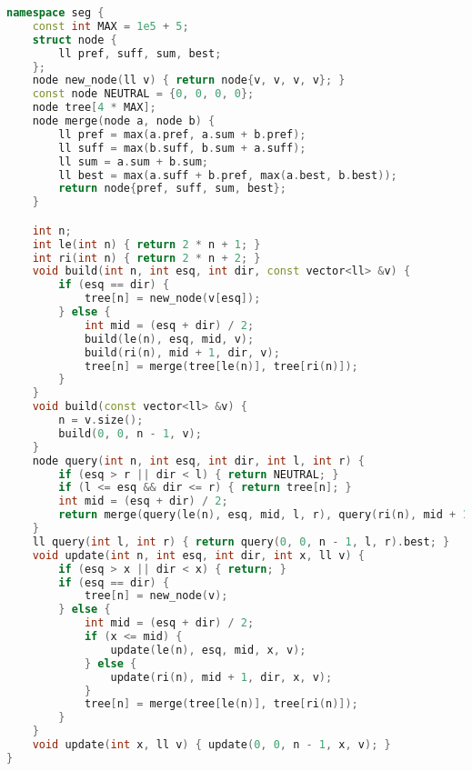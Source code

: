 \documentclass[11pt, a4paper, twoside]{book}
\begin{document}
\begin{lstlisting}[language=C++]
namespace seg {
    const int MAX = 1e5 + 5;
    struct node {
        ll pref, suff, sum, best;
    };
    node new_node(ll v) { return node{v, v, v, v}; }
    const node NEUTRAL = {0, 0, 0, 0};
    node tree[4 * MAX];
    node merge(node a, node b) {
        ll pref = max(a.pref, a.sum + b.pref);
        ll suff = max(b.suff, b.sum + a.suff);
        ll sum = a.sum + b.sum;
        ll best = max(a.suff + b.pref, max(a.best, b.best));
        return node{pref, suff, sum, best};
    }

    int n;
    int le(int n) { return 2 * n + 1; }
    int ri(int n) { return 2 * n + 2; }
    void build(int n, int esq, int dir, const vector<ll> &v) {
        if (esq == dir) {
            tree[n] = new_node(v[esq]);
        } else {
            int mid = (esq + dir) / 2;
            build(le(n), esq, mid, v);
            build(ri(n), mid + 1, dir, v);
            tree[n] = merge(tree[le(n)], tree[ri(n)]);
        }
    }
    void build(const vector<ll> &v) {
        n = v.size();
        build(0, 0, n - 1, v);
    }
    node query(int n, int esq, int dir, int l, int r) {
        if (esq > r || dir < l) { return NEUTRAL; }
        if (l <= esq && dir <= r) { return tree[n]; }
        int mid = (esq + dir) / 2;
        return merge(query(le(n), esq, mid, l, r), query(ri(n), mid + 1, dir, l, r));
    }
    ll query(int l, int r) { return query(0, 0, n - 1, l, r).best; }
    void update(int n, int esq, int dir, int x, ll v) {
        if (esq > x || dir < x) { return; }
        if (esq == dir) {
            tree[n] = new_node(v);
        } else {
            int mid = (esq + dir) / 2;
            if (x <= mid) {
                update(le(n), esq, mid, x, v);
            } else {
                update(ri(n), mid + 1, dir, x, v);
            }
            tree[n] = merge(tree[le(n)], tree[ri(n)]);
        }
    }
    void update(int x, ll v) { update(0, 0, n - 1, x, v); }
}
\end{lstlisting}

\hfill
\end{document}

